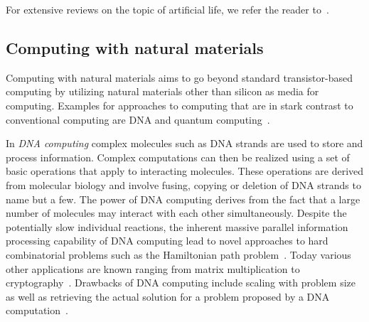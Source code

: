 		For extensive reviews on the topic of artificial life, we refer the reader to~\cite{Langton:1995:ALO:526815,Boden:1996:PAL:525139,bedau2000open,taylor1993artificial}.

		\FloatBarrier

	\subsection{Computing with natural materials}

		Computing with natural materials aims to go beyond standard transistor-based computing by utilizing natural materials other than silicon as media for computing. Examples for approaches to computing that are in stark contrast to conventional computing are DNA and quantum computing~\cite{de2007fundamentals}. 

		In \emph{DNA computing} complex molecules such as DNA strands are used to store and process information. Complex computations can then be realized using a set of basic operations that apply to interacting molecules. These operations are derived from molecular biology and involve fusing, copying or deletion of DNA strands to name but a few. The power of DNA computing derives from the fact that a large number of molecules may interact with each other simultaneously. Despite the potentially slow individual reactions, the inherent massive parallel information processing capability of DNA computing lead to novel approaches to hard combinatorial problems such as the Hamiltonian path problem~\cite{adleman1994molecular}. Today various other applications are known ranging from matrix multiplication to cryptography~\cite{puaun2000computing,boneh1996computational,lipton1996breaking,oliver1998computation}. Drawbacks of DNA computing include scaling with problem size as well as retrieving the actual solution for a problem proposed by a DNA computation~\cite{de2007fundamentals}.

